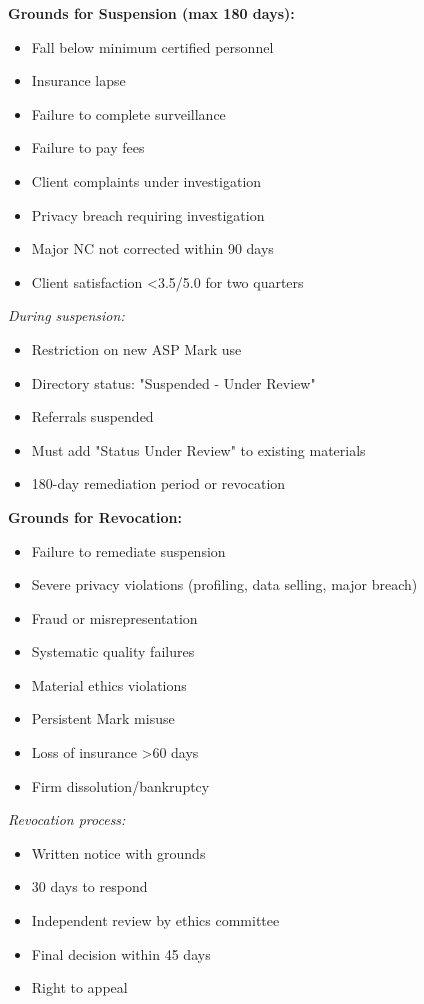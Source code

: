 \documentclass[11pt,a4paper]{article}
\begin{document}
\textbf{Grounds for Suspension (max 180 days):}
\begin{itemize}
\item Fall below minimum certified personnel
\item Insurance lapse
\item Failure to complete surveillance
\item Failure to pay fees
\item Client complaints under investigation
\item Privacy breach requiring investigation
\item Major NC not corrected within 90 days
\item Client satisfaction <3.5/5.0 for two quarters
\end{itemize}

\textit{During suspension:}
\begin{itemize}
\item Restriction on new ASP Mark use
\item Directory status: "Suspended - Under Review"
\item Referrals suspended
\item Must add "Status Under Review" to existing materials
\item 180-day remediation period or revocation
\end{itemize}

\textbf{Grounds for Revocation:}
\begin{itemize}
\item Failure to remediate suspension
\item Severe privacy violations (profiling, data selling, major breach)
\item Fraud or misrepresentation
\item Systematic quality failures
\item Material ethics violations
\item Persistent Mark misuse
\item Loss of insurance >60 days
\item Firm dissolution/bankruptcy
\end{itemize}

\textit{Revocation process:}
\begin{itemize}
\item Written notice with grounds
\item 30 days to respond
\item Independent review by ethics committee
\item Final decision within 45 days
\item Right to appeal
\end{itemize}
\end{document}
